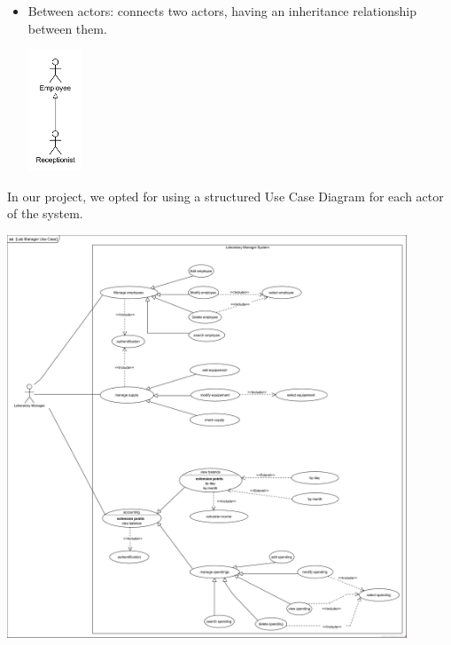 \documentclass{article}
\begin{document}
\begin{itemize}
\begin{itemize}
\begin{center}
        \end{center}
        \item Between actors: connects two actors, having an inheritance relationship between them.
        \begin{center}
            \includegraphics[width=60px]{media/inheritence.jpg}
        \end{center}  
    \end{itemize}
\end{itemize}

In our project, we opted for using a structured Use Case Diagram for each actor of the system.

\begin{center}
    \includegraphics[width=451px]{media/Use case diagrams/Lab Manager Use Case.png}
\end{center}
\end{document}

